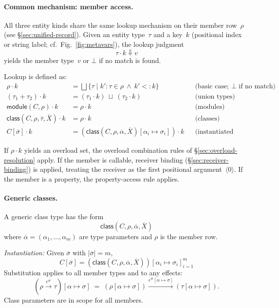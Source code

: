 \paragraph{Common mechanism: member access.}
All three entity kinds share the same lookup mechanism on their member row~$\rho$ (see \S\ref{sec:unified-record}).  
Given an entity type~$\tau$ and a key~$k$ (positional index or string label; cf.\ Fig.~\ref{fig:metavars}), the lookup judgment
\[
\tau \cdot k \Downarrow v
\]
yields the member type~$v$ or $\bot$ if no match is found.

Lookup is defined as:
\begin{align*}
\rho \cdot k &= \bigsqcup \{\tau \mid k'{:}\tau \in \rho \ \wedge\ k' <: k \}
  &&\text{(basic case; $\bot$ if no match)}\\
(\tau_1 + \tau_2) \cdot k &= (\tau_1 \cdot k) \ \sqcup\ (\tau_2 \cdot k)
  &&\text{(union types)} \\
\mathsf{module}(C, \rho) \cdot k &= \rho \cdot k
  &&\text{(modules)}\\
\mathsf{class}(C, \rho, \overline{\tau}, \overline{X}) \cdot k &= \rho \cdot k
  &&\text{(classes)}\\
C[\overline{\sigma}] \cdot k &= (\mathsf{class}(C, \rho, \overline{\alpha}, \overline{X})[\alpha_i \mapsto \sigma_i]) \cdot k
  &&\text{(instantiated classes)}
\end{align*}

If $\rho \cdot k$ yields an overload set, the overload combination rules of \S\ref{sec:overload-resolution} apply.  
If the member is callable, receiver binding (\S\ref{sec:receiver-binding}) is applied, treating the receiver as the first positional argument~$\langle 0\rangle$.  
If the member is a property, the property-access rule applies.

\paragraph{Generic classes.}
A generic class type has the form
\[
\mathsf{class}(C, \rho, \overline{\alpha}, \overline{X})
\]
where $\overline{\alpha} = (\alpha_1,\dots,\alpha_m)$ are type parameters and $\rho$ is the member row.

\emph{Instantiation:} Given $\overline{\sigma}$ with $|\overline{\sigma}| = m$,
\[
C[\overline{\sigma}] = (\mathsf{class}(C, \rho, \overline{\alpha}, \overline{X}))[\alpha_i \mapsto \sigma_i]_{i=1}^m
\]
Substitution applies to all member types and to any effects:
\[
(\rho \xrightarrow{\epsilon^\#} \tau)[\alpha \mapsto \sigma] \;=\; (\rho[\alpha \mapsto \sigma]) \xrightarrow{\epsilon^\#[\alpha \mapsto \sigma]} (\tau[\alpha \mapsto \sigma]).
\]
Class parameters are in scope for all members.

